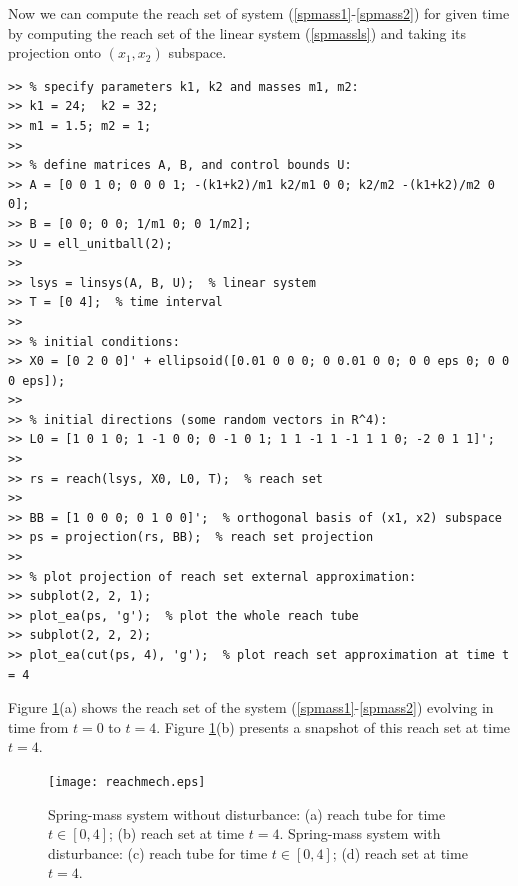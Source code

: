 Now we can compute the reach set of system (\ref{spmass1}-\ref{spmass2})
for given time by computing the reach set of the linear system (\ref{spmassls})
and taking its projection onto $(x_1, x_2)$ subspace.
{\tt \begin{verbatim}
>> % specify parameters k1, k2 and masses m1, m2:
>> k1 = 24;  k2 = 32;
>> m1 = 1.5; m2 = 1;
>>
>> % define matrices A, B, and control bounds U:
>> A = [0 0 1 0; 0 0 0 1; -(k1+k2)/m1 k2/m1 0 0; k2/m2 -(k1+k2)/m2 0 0];
>> B = [0 0; 0 0; 1/m1 0; 0 1/m2];
>> U = ell_unitball(2);
>>
>> lsys = linsys(A, B, U);  % linear system
>> T = [0 4];  % time interval
>>
>> % initial conditions:
>> X0 = [0 2 0 0]' + ellipsoid([0.01 0 0 0; 0 0.01 0 0; 0 0 eps 0; 0 0 0 eps]);
>>
>> % initial directions (some random vectors in R^4):
>> L0 = [1 0 1 0; 1 -1 0 0; 0 -1 0 1; 1 1 -1 1 -1 1 1 0; -2 0 1 1]';
>>
>> rs = reach(lsys, X0, L0, T);  % reach set
>>
>> BB = [1 0 0 0; 0 1 0 0]';  % orthogonal basis of (x1, x2) subspace
>> ps = projection(rs, BB);  % reach set projection
>>
>> % plot projection of reach set external approximation:
>> subplot(2, 2, 1);
>> plot_ea(ps, 'g');  % plot the whole reach tube
>> subplot(2, 2, 2);
>> plot_ea(cut(ps, 4), 'g');  % plot reach set approximation at time t = 4
\end{verbatim}}
Figure \ref{mechreachfig}(a) shows the reach set of the system
(\ref{spmass1}-\ref{spmass2}) evolving in time from $t=0$ to $t=4$.
Figure \ref{mechreachfig}(b) presents a snapshot of this reach set at time
$t=4$.
\begin{figure}%
\centerline{
\texttt{[image: reachmech.eps]}}
\caption{Spring-mass system without disturbance:
(a) reach tube for time $t\in[0,4]$; (b) reach set at time $t=4$.
Spring-mass system with disturbance:
(c) reach tube for time $t\in[0,4]$; (d) reach set at time $t=4$.}
\label{mechreachfig}
\end{figure}

